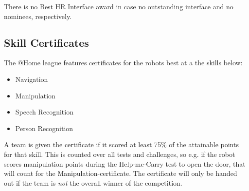 There is no Best HR Interface award in case no outstanding interface and no nominees, respectively.

%
%
%

\subsection{Skill Certificates}
  \label{award:skill}
  The @Home league features certificates for the robots best at a the skills below:
  \begin{itemize}
   \item Navigation
   \item Manipulation
   \item Speech Recognition
   \item Person Recognition
  \end{itemize}
  
  A team is given the certificate if it scored at least 75\% of the attainable points for that skill.
  This is counted over all tests and challenges, so e.g. if the robot scores manipulation points during the Help-me-Carry test to open the door, that will count for the Manipulation-certificate.
  The certificate will only be handed out if the team is \emph{not} the overall winner of the competition. 
